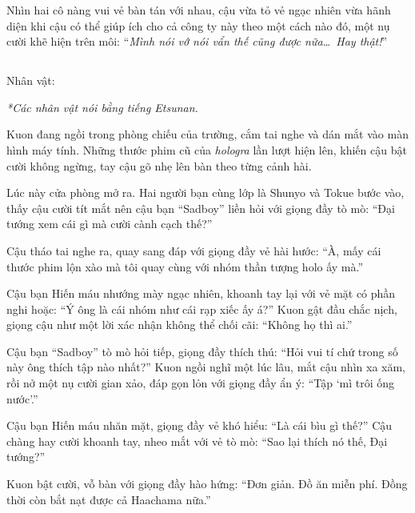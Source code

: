 \documentclass[../main.tex]{subfiles}
\begin{document}
Nhìn hai cô nàng vui vẻ bàn tán với nhau, cậu vừa tỏ vẻ ngạc nhiên vừa hãnh diện khi cậu có thể giúp ích cho cả công ty này theo một cách nào đó, một nụ cười khẽ hiện trên môi: ``\textit{Mình nói vớ nói vẩn thế cũng được nữa\dots\ Hay thật!}''

\newpage

\subsection*{\label{ep-S13.X}}
\begin{center}
  {\caviar\fontsize{12pt}{12pt}\selectfont Nhân vật:  }
\end{center}

\begin{center}
  {\textit{*Các nhân vật nói bằng tiếng Etsunan.}}
\end{center}

Kuon đang ngồi trong phòng chiếu của trường, cắm tai nghe và dán mắt vào màn hình máy tính. Những thước phim cũ của \textit{hologra} lần lượt hiện lên, khiến cậu bật cười không ngừng, tay cậu gõ nhẹ lên bàn theo từng cảnh hài.

Lúc này cửa phòng mở ra. Hai người bạn cùng lớp là Shunyo và Tokue bước vào, thấy cậu cười tít mắt nên cậu bạn ``Sadboy'' liền hỏi với giọng đầy tò mò: ``Đại tướng xem cái gì mà cười cành cạch thế?''

Cậu tháo tai nghe ra, quay sang đáp với giọng đầy vẻ hài hước: ``À, mấy cái thước phim lộn xào mà tôi quay cùng với nhóm thần tượng holo ấy mà.''

Cậu bạn Hiến máu nhướng mày ngạc nhiên, khoanh tay lại với vẻ mặt có phần nghi hoặc: ``Ý ông là cái nhóm như cái rạp xiếc ấy á?'' Kuon gật đầu chắc nịch, giọng cậu như một lời xác nhận không thể chối cãi: ``Không họ thì ai.''

Cậu bạn ``Sadboy'' tò mò hỏi tiếp, giọng đầy thích thú: ``Hỏi vui tí chứ trong số này ông thích tập nào nhất?'' Kuon ngồi nghĩ một lúc lâu, mắt cậu nhìn xa xăm, rồi nở một nụ cười gian xảo, đáp gọn lỏn với giọng đầy ẩn ý: ``Tập `mì trôi ống nước'.''

Cậu bạn Hiến máu nhăn mặt, giọng đầy vẻ khó hiểu: ``Là cái bìu gì thế?'' Cậu chàng hay cười khoanh tay, nheo mắt với vẻ tò mò: ``Sao lại thích nó thế, Đại tướng?''

Kuon bật cười, vỗ bàn với giọng đầy hào hứng: ``Đơn giản. Đồ ăn miễn phí. Đồng thời còn bắt nạt được cả Haachama nữa.''
\end{document}
